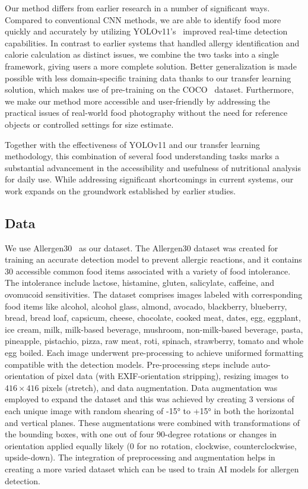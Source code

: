 \documentclass[10pt,twocolumn,letterpaper]{article}
\begin{document}
Our method differs from earlier research in a number of significant ways. Compared to conventional CNN methods, we are able to identify food more quickly and accurately by utilizing YOLOv11's~\cite{redmon2016lookonceunifiedrealtime} improved real-time detection capabilities. 
In contrast to earlier systems that handled allergy identification and calorie calculation as distinct issues, we combine the two tasks into a single framework, giving users a more complete solution. 
Better generalization is made possible with less domain-specific training data thanks to our transfer learning solution, which makes use of pre-training on the COCO~\cite{lin2015microsoftcococommonobjects} dataset. 
Furthermore, we make our method more accessible and user-friendly by addressing the practical issues of real-world food photography without the need for reference objects or controlled settings for size estimate.

Together with the effectiveness of YOLOv11 and our transfer learning methodology, this combination of several food understanding tasks marks a substantial advancement in the accessibility and usefulness of nutritional analysis for daily use. 
While addressing significant shortcomings in current systems, our work expands on the groundwork established by earlier studies.

\subsection{Data}

We use Allergen30~\cite{mishra2022allergen30} as our dataset.
The Allergen30 dataset was created for training an accurate detection model to prevent allergic reactions, and it contains 30 accessible common food items associated with a variety of food intolerance. 
The intolerance include lactose, histamine, gluten, salicylate, caffeine, and ovomucoid sensitivities.
The dataset comprises images labeled with corresponding food items like alcohol, alcohol glass, almond, avocado, blackberry, blueberry, bread, bread loaf, capsicum, cheese, chocolate, cooked meat, dates, egg, eggplant, ice cream, milk, milk-based beverage, mushroom, non-milk-based beverage, pasta, pineapple, pistachio, pizza, raw meat, roti, spinach, strawberry, tomato and whole egg boiled. 
Each image underwent pre-processing to achieve uniformed formatting compatible with the detection models. 
Pre-processing steps include auto-orientation of pixel data (with EXIF-orientation stripping), resizing images to $416 \times 416$ pixels (stretch), and data augmentation. Data augmentation was employed to expand the dataset and this was achieved by creating 3 versions of each unique image with random shearing of -15° to +15° in both the horizontal and vertical planes. 
These augmentations were combined with transformations of the bounding boxes, with one out of four 90-degree rotations or changes in orientation applied equally likely (0 for no rotation, clockwise, counterclockwise, upside-down). 
The integration of preprocessing and augmentation helps in creating a more varied dataset which can be used to train AI models for allergen detection.
\end{document}

